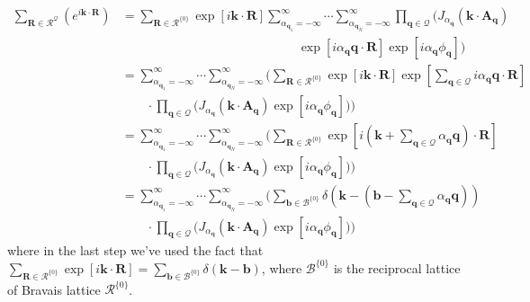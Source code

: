 \documentclass[12pt]{article}
\begin{document}
\begin{align*}
    \sum_{\mathbf{R}\in\mathcal{R}^{\mathcal{Q}}}\left( e^{i\mathbf{k}\cdot\mathbf{R}} \right) 
        &= \sum_{\mathbf{R}\in\mathcal{R}^{\{0\}}} \exp\left[i\mathbf{k}\cdot\mathbf{R}\right] \sum_{\alpha_{\mathbf{q}_1}=-\infty}^{\infty} \cdots \sum_{\alpha_{\mathbf{q}_N}=-\infty}^{\infty} \prod_{\mathbf{q}\in\mathcal{Q}} \bigg( J_{\alpha_{\mathbf{q}}}\left(\mathbf{k}\cdot\mathbf{A}_{\mathbf{q}}\right) \\
        & \qquad\qquad\qquad\qquad\qquad\qquad\qquad \exp\left[i\alpha_{\mathbf{q}}\mathbf{q}\cdot\mathbf{R}\right]\exp\left[i\alpha_{\mathbf{q}}\phi_{\mathbf{q}}\right] \bigg)\\
        &= \sum_{\alpha_{\mathbf{q}_1}=-\infty}^{\infty} \cdots \sum_{\alpha_{\mathbf{q}_N}=-\infty}^{\infty} \Bigg( \sum_{\mathbf{R}\in\mathcal{R}^{\{0\}}} \exp\left[i\mathbf{k}\cdot\mathbf{R}\right]  \exp\left[\sum_{\mathbf{q}\in\mathcal{Q}} i\alpha_{\mathbf{q}}\mathbf{q}\cdot\mathbf{R}\right] \\
        & \qquad \cdot \prod_{\mathbf{q}\in\mathcal{Q}} \bigg( J_{\alpha_{\mathbf{q}}}\left(\mathbf{k}\cdot\mathbf{A}_{\mathbf{q}}\right) \exp\left[i\alpha_{\mathbf{q}}\phi_{\mathbf{q}}    \right] \bigg) \Bigg) \\
        &= \sum_{\alpha_{\mathbf{q}_1}=-\infty}^{\infty} \cdots \sum_{\alpha_{\mathbf{q}_N}=-\infty}^{\infty} \Bigg( \sum_{\mathbf{R}\in\mathcal{R}^{\{0\}}} \exp\left[i\left(\mathbf{k}+\sum_{\mathbf{q}\in\mathcal{Q}}\alpha_{\mathbf{q}}\mathbf{q}\right)\cdot\mathbf{R}\right] \\
        & \qquad \cdot \prod_{\mathbf{q}\in\mathcal{Q}} \bigg( J_{\alpha_{\mathbf{q}}}\left(\mathbf{k}\cdot\mathbf{A}_{\mathbf{q}}\right) \exp\left[i\alpha_{\mathbf{q}}\phi_{\mathbf{q}}    \right] \bigg) \Bigg) \\
        &= \sum_{\alpha_{\mathbf{q}_1}=-\infty}^{\infty} \cdots \sum_{\alpha_{\mathbf{q}_N}=-\infty}^{\infty} \Bigg( \sum_{\mathbf{b}\in\mathcal{B}^{\{0\}}}\delta\left(\mathbf{k}-\left(\mathbf{b}-\sum_{\mathbf{q}\in\mathcal{Q}}\alpha_{\mathbf{q}}\mathbf{q}\right)\right) \\
        & \qquad \cdot \prod_{\mathbf{q}\in\mathcal{Q}} \bigg( J_{\alpha_{\mathbf{q}}}\left(\mathbf{k}\cdot\mathbf{A}_{\mathbf{q}}\right) \exp\left[i\alpha_{\mathbf{q}}\phi_{\mathbf{q}}    \right] \bigg) \Bigg)
\end{align*}
where in the last step we've used the fact that $\sum_{\mathbf{R}\in\mathcal{R}^{\{0\}}}\exp\left[i\mathbf{k}\cdot\mathbf{R}\right] = \sum_{\mathbf{b}\in\mathcal{B}^{\{0\}}}\delta\left(\mathbf{k}-\mathbf{b}\right)$, where $\mathcal{B}^{\{0\}}$ is the reciprocal lattice of Bravais lattice $\mathcal{R}^{\{0\}}$.
\end{document}
